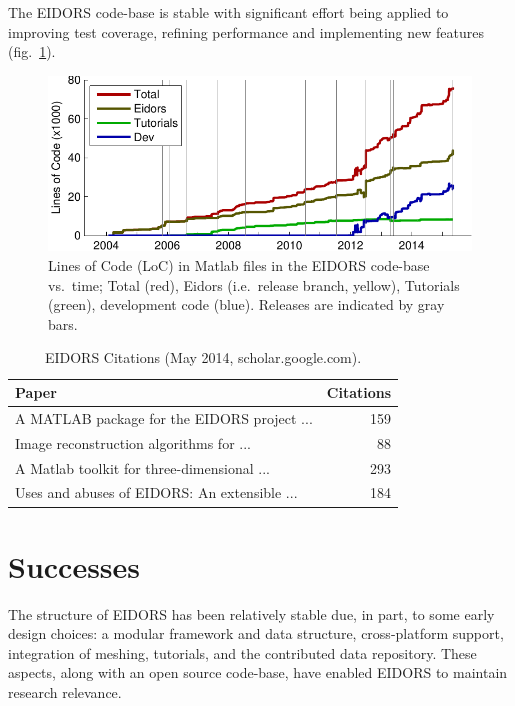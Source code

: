 \documentclass[10pt,a4paper]{article}
\begin{document}
\begin{multicols}{2}
The EIDORS code-base is stable with significant effort being applied to
improving test coverage, refining performance and implementing new features
(fig.~\ref{fig:loc}).

\begin{figure}[H]
  \vspace{-2.5mm}
\centering
\includegraphics[width=.96\columnwidth]{fig_loc.pdf}
\caption{\label{fig:loc}%
  Lines of Code (LoC) in Matlab files in the EIDORS code-base vs.\ time; Total
   (red), Eidors (i.e.\ release branch, yellow), Tutorials (green), development code (blue).
   Releases are indicated by gray bars.
}
\end{figure}
\vspace{-1.5em}
\begin{table}[H]
  \footnotesize
\centering
\caption{\label{tbl:cite} EIDORS Citations
 (May 2014, scholar.google.com).
}
\begin{tabular}{lr}
  \toprule
  Paper & Citations \\
  \midrule
  \cite{vauhkonen2001} A MATLAB package for the EIDORS project {\tiny ...}  & 159 \\
  \cite{polydorides2002phd} Image reconstruction algorithms for {\tiny ...}  & 88 \\
  \cite{polydorides2002matlab} A Matlab toolkit for three-dimensional {\tiny ...}  & 293 \\
  \cite{adler2006} Uses and abuses of {EIDORS}: An extensible {\tiny ...} & 184 \\
  \bottomrule
\end{tabular}
\vspace{-1em}
\end{table}

\section{Successes}
The structure of EIDORS has been relatively stable due, in part, to some early design choices:
a modular framework and data structure,
cross-platform support, integration of meshing,
tutorials, and the contributed data repository.
These aspects, along with an open source code-base, have enabled EIDORS to
maintain research relevance.


\end{multicols}
\end{document}
